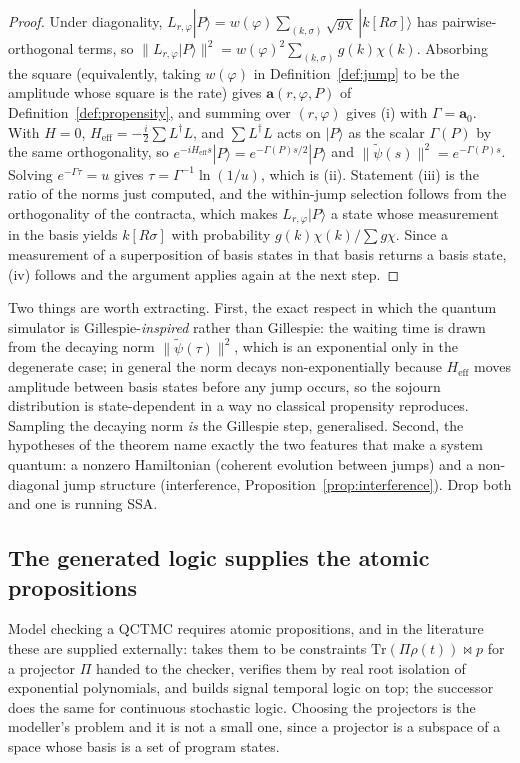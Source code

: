 \documentclass[11pt,a4paper]{article}
\theoremstyle{plain}
\theoremstyle{definition}
\theoremstyle{remark}
\newcommand{\prop}{\mathbf{a}}
\newcommand{\wmap}{w}
\newcommand{\gfac}{g}
\newcommand{\Lop}{L}
\newcommand{\Heff}{H_{\mathrm{eff}}}
\begin{document}
\begin{proof}
Under diagonality, $\Lop_{r,\varphi}|P\rangle = \wmap(\varphi)\sum_{(k,\sigma)}\sqrt{\gfac \chi}\,
|k[R\sigma]\rangle$ has pairwise-orthogonal terms, so
$\|\Lop_{r,\varphi}|P\rangle\|^2 = \wmap(\varphi)^2\sum_{(k,\sigma)}\gfac(k)\chi(k)$. Absorbing the
square (equivalently, taking $\wmap(\varphi)$ in Definition~\ref{def:jump} to be the amplitude whose
square is the rate) gives $\prop(r,\varphi,P)$ of Definition~\ref{def:propensity}, and summing over
$(r,\varphi)$ gives (i) with $\Gamma = \prop_0$. With $H=0$,
$\Heff = -\tfrac{i}{2}\sum \Lop^\dagger \Lop$, and $\sum\Lop^\dagger\Lop$ acts on $|P\rangle$ as the
scalar $\Gamma(P)$ by the same orthogonality, so
$e^{-i\Heff s}|P\rangle = e^{-\Gamma(P)s/2}|P\rangle$ and $\|\tilde\psi(s)\|^2 = e^{-\Gamma(P)s}$.
Solving $e^{-\Gamma\tau} = u$ gives $\tau = \Gamma^{-1}\ln(1/u)$, which is (ii). Statement (iii) is
the ratio of the norms just computed, and the within-jump selection follows from the orthogonality of
the contracta, which makes $\Lop_{r,\varphi}|P\rangle$ a state whose measurement in the basis yields
$k[R\sigma]$ with probability $\gfac(k)\chi(k)/\sum \gfac \chi$. Since a measurement of a
superposition of basis states in that basis returns a basis state, (iv) follows and the argument
applies again at the next step.
\end{proof}

Two things are worth extracting. First, the exact respect in which the quantum simulator is
Gillespie-\emph{inspired} rather than Gillespie: the waiting time is drawn from the decaying norm
$\|\tilde\psi(\tau)\|^2$, which is an exponential only in the degenerate case; in general the norm
decays non-exponentially because $\Heff$ moves amplitude between basis states before any jump
occurs, so the sojourn distribution is state-dependent in a way no classical propensity reproduces.
Sampling the decaying norm \emph{is} the Gillespie step, generalised. Second, the hypotheses of the
theorem name exactly the two features that make a system quantum: a nonzero Hamiltonian (coherent
evolution between jumps) and a non-diagonal jump structure (interference,
Proposition~\ref{prop:interference}). Drop both and one is running SSA.

\subsection{The generated logic supplies the atomic propositions}
\label{sec:qctmc-logic}

Model checking a QCTMC requires atomic propositions, and in the literature these are supplied
externally: \cite{qctmc} takes them to be constraints $\mathrm{Tr}(\Pi \rho(t)) \bowtie p$ for a
projector $\Pi$ handed to the checker, verifies them by real root isolation of exponential
polynomials, and builds signal temporal logic on top; the successor \cite{qctmc-csl} does the same
for continuous stochastic logic. Choosing the projectors is the modeller's problem and it is not a
small one, since a projector is a subspace of a space whose basis is a set of program states.
\end{document}
